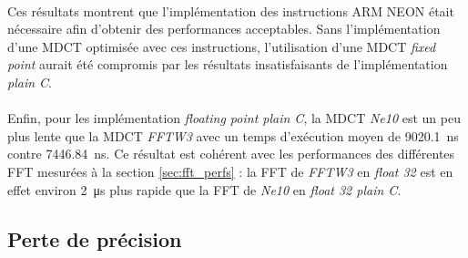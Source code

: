 \documentclass{article}
\begin{document}
    \paragraph{}
    Ces résultats montrent que l'implémentation des instructions ARM NEON était nécessaire afin d'obtenir des performances acceptables. Sans l'implémentation d'une MDCT optimisée avec ces instructions, l'utilisation d'une MDCT \emph{fixed point} aurait été compromis par les résultats insatisfaisants de l'implémentation \emph{plain C}.

    \paragraph{}
    Enfin, pour les implémentation \emph{floating point plain C}, la MDCT \emph{Ne10} est un peu plus lente que la MDCT \emph{FFTW3} avec un temps d'exécution moyen de \SI{9020.1}{\nano\second} contre \SI{7446.84}{\nano\second}. Ce résultat est cohérent avec les performances des différentes FFT mesurées à la section \ref{sec:fft_perfs} : la FFT de \emph{FFTW3} en \emph{float 32} est en effet environ \SI{2}{\micro\second} plus rapide que la FFT de \emph{Ne10} en \emph{float 32 plain C}.




 





    \subsection{Perte de précision}
    \label{sec:precision}




    \newpage
\end{document}
